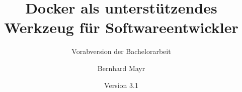 \documentclass[a4paper, ngerman, bibliography=totoc]{scrreprt}  %
\title{Docker als unterstützendes Werkzeug für Softwareentwickler}
\subtitle{Vorabversion der Bachelorarbeit}
\author{Bernhard Mayr}
\date{Version 3.1}
\begin{document}
\maketitle


\tableofcontents






\listoffigures{}
\lstlistoflistings{}
\printbibliography{}
\end{document}
